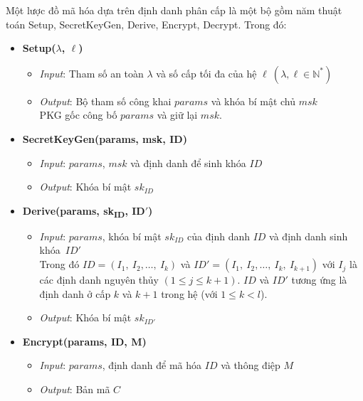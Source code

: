 \documentclass[class=report, crop=false]{standalone}
\begin{document}
		\begin{definition}[HIBE]
			Một lược đồ mã hóa dựa trên định danh phân cấp là một bộ gồm năm thuật toán \textsf{Setup, SecretKeyGen, Derive, Encrypt, Decrypt}. Trong đó:
			\vspace{-0.5cm}
			\begin{itemize}
				\item[] {\sffamily\bfseries Setup($\lambda$, $\ell$)}
				\begin{itemize}
					\item[\textbullet] \textit{Input}: Tham số an toàn $\lambda$ và số cấp tối đa của hệ $\ell \ (\lambda, \ell \in \mathbb{N^*})$
					\item[\textbullet] \textit{Output}: Bộ tham số công khai $params$ và khóa bí mật chủ $msk$ \\
					PKG gốc công bố $params$ và giữ lại $msk$.
				\end{itemize}
				\item[] {\sffamily\bfseries SecretKeyGen(params, msk, ID)}
				\begin{itemize}
					\item[\textbullet] \textit{Input}: $params$, $msk$ và định danh để sinh khóa $ID$
					\item[\textbullet] \textit{Output}: Khóa bí mật $sk_{ID}$
				\end{itemize}
				\item[] {\sffamily\bfseries Derive(params, sk\textsubscript{ID}, ID$'$)}
				\begin{itemize}
					\item[\textbullet] \textit{Input}: $params$, khóa bí mật $sk_{ID}$ của định danh $ID$ và định danh sinh khóa~$ID'$ \\
					Trong đó $ID = (I_1,\ I_2, \dots,\ I_k)$ và $ID' = (I_1,\ I_2, \dots,\ I_k,\ I_{k + 1})$ với $I_j$ là các định danh nguyên thủy $(1 \leq j \leq k + 1)$. $ID$ và $ID'$ tương ứng là định danh ở cấp $k$ và $k + 1$ trong hệ (với $1 \leq k < l$).
					\item[\textbullet] \textit{Output}: Khóa bí mật $sk_{ID'}$
				\end{itemize}
				\item[] {\sffamily\bfseries Encrypt(params, ID, M)}
				\begin{itemize}
					\item[\textbullet] \textit{Input}: $params$, định danh để mã hóa $ID$ và thông điệp $M$
					\item[\textbullet] \textit{Output}: Bản mã $C$
				\end{itemize}

\end{itemize}
\end{definition}
\end{document}
